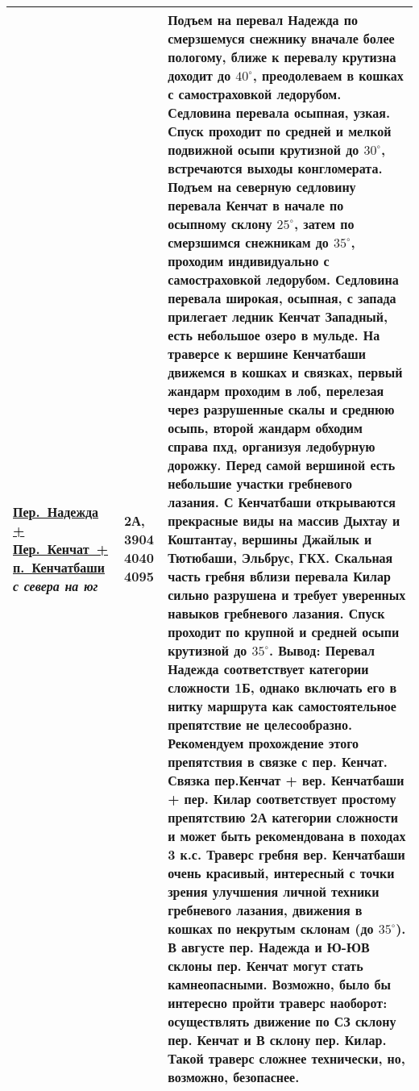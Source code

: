 {\begin{longtable}{|>{\centering\arraybackslash}m{3.8cm}|>{\centering\arraybackslash}m{1.3cm}|>{\raggedright\arraybackslash}m{12.5cm}|}
			\hyperref[subsec:Day16]{Пер.~Надежда + Пер.~Кенчат~+ п.~Кенчатбаши}										\newline\textit{с севера на юг}			&	2А, 3904 4040 4095			&	Подъем на перевал Надежда по смерзшемуся снежнику вначале более пологому, ближе к перевалу крутизна доходит до $40^\circ$, преодолеваем в кошках с самостраховкой ледорубом. Седловина перевала осыпная, узкая. Спуск проходит по средней и мелкой подвижной осыпи крутизной до $30^\circ$, встречаются выходы конгломерата. Подъем на северную седловину перевала Кенчат в начале по осыпному склону $25^\circ$, затем по смерзшимся снежникам до $35^\circ$, проходим индивидуально с самостраховкой ледорубом. Седловина перевала широкая, осыпная, с запада прилегает ледник Кенчат Западный, есть небольшое озеро в мульде. На траверсе к вершине Кенчатбаши движемся в кошках и связках, первый жандарм проходим в лоб, перелезая через разрушенные скалы и среднюю осыпь, второй жандарм обходим справа пхд, организуя ледобурную дорожку. Перед самой вершиной есть небольшие участки гребневого лазания. С Кенчатбаши открываются прекрасные виды на массив Дыхтау и Коштантау, вершины Джайлык и Тютюбаши, Эльбрус, ГКХ. Скальная часть гребня вблизи перевала Килар сильно разрушена и требует уверенных навыков гребневого лазания. Спуск проходит по крупной и средней осыпи крутизной до $35^\circ$. \newline \textbf{Вывод:} Перевал Надежда соответствует категории сложности 1Б, однако включать его в нитку маршрута как самостоятельное препятствие не целесообразно. Рекомендуем прохождение этого препятствия в связке с пер. Кенчат. Связка пер.Кенчат + вер. Кенчатбаши + пер. Килар соответствует простому препятствию 2А категории сложности и может быть рекомендована в походах 3 к.с. Траверс гребня вер. Кенчатбаши очень красивый, интересный с точки зрения улучшения личной техники гребневого лазания, движения в кошках по некрутым склонам (до $35^\circ$). В августе пер. Надежда и Ю-ЮВ склоны пер. Кенчат могут стать камнеопасными. Возможно, было бы интересно пройти траверс наоборот: осуществлять движение по СЗ склону пер. Кенчат и В склону пер. Килар. Такой траверс сложнее технически, но, возможно, безопаснее.	\\ \hline

\end{longtable}}
